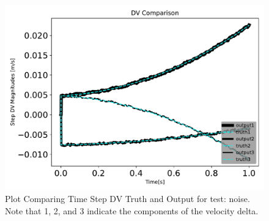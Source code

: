 \begin{figure}[htbp]\centerline{\includegraphics[height=0.7\textwidth, keepaspectratio]{AutoTeX/noiseDVcomparison}}\caption{Plot Comparing Time Step DV Truth and Output for test: noise. Note that 1, 2, and 3 indicate the components of the velocity delta.}\label{fig:noiseDVcomparison}\end{figure}